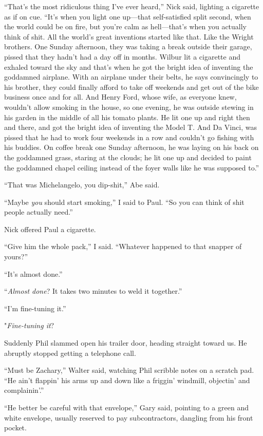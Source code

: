 ``That's the most ridiculous thing I've ever heard,'' Nick said,
lighting a cigarette as if on cue. ``It's when you light one up---that
self-satisfied split second, when the world could be on fire, but you're
calm as hell---that's when you actually think of shit. All the world's
great inventions started like that. Like the Wright brothers. One Sunday
afternoon, they was taking a break outside their garage, pissed that
they hadn't had a day off in months. Wilbur lit a cigarette and exhaled
toward the sky and that's when he got the bright idea of inventing the
goddamned airplane. With an airplane under their belts, he says
convincingly to his brother, they could finally afford to take off
weekends and get out of the bike business once and for all. And Henry
Ford, whose wife, as everyone knew, wouldn't allow smoking in the house,
so one evening, he was outside stewing in his garden in the middle of
all his tomato plants. He lit one up and right then and there, and got
the bright idea of inventing the Model T. And Da Vinci, was pissed that
he had to work four weekends in a row and couldn't go fishing with his
buddies. On coffee break one Sunday afternoon, he was laying on his back
on the goddamned grass, staring at the clouds; he lit one up and decided
to paint the goddamned chapel ceiling instead of the foyer walls like he
was supposed to.''

``That was Michelangelo, you dip-shit,'' Abe said.

``Maybe \emph{you} should start smoking,'' I said to Paul. ``So you can
think of shit people actually need.''

Nick offered Paul a cigarette.

``Give him the whole pack,'' I said. ``Whatever happened to that snapper
of yours?''

``It's almost done.''

``\emph{Almost done}? It takes two minutes to weld it together.''

``I'm fine-tuning it.''

"\emph{Fine-tuning it}?

Suddenly Phil slammed open his trailer door, heading straight toward us.
He abruptly stopped getting a telephone call.

``Must be Zachary,'' Walter said, watching Phil scribble notes on a
scratch pad. ``He ain't flappin' his arms up and down like a friggin'
windmill, objectin' and complainin'.''

``He better be careful with that envelope,'' Gary said, pointing to a
green and white envelope, usually reserved to pay subcontractors,
dangling from his front pocket.

